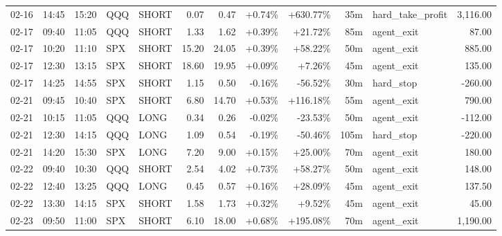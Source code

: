 \documentclass[11pt,a4paper,twoside]{article}
\begin{document}
\begin{center}
\begin{longtable}{>{\color{txtmain}}l l l l l r r r r r >{\color{txtmain}}l r}
02-16 & 14:45 & 15:20 & QQQ & SHORT & 0.07 & 0.47 & \textcolor{wingreen}{+0.74\%} & \textcolor{wingreen}{+630.77\%} & 35m & hard\_take\_profit & \textcolor{wingreen}{3,116.00} \\
02-17 & 09:40 & 11:05 & QQQ & SHORT & 1.33 & 1.62 & \textcolor{wingreen}{+0.39\%} & \textcolor{wingreen}{+21.72\%} & 85m & agent\_exit & \textcolor{wingreen}{87.00} \\
02-17 & 10:20 & 11:10 & SPX & SHORT & 15.20 & 24.05 & \textcolor{wingreen}{+0.39\%} & \textcolor{wingreen}{+58.22\%} & 50m & agent\_exit & \textcolor{wingreen}{885.00} \\
02-17 & 12:30 & 13:15 & SPX & SHORT & 18.60 & 19.95 & \textcolor{wingreen}{+0.09\%} & \textcolor{wingreen}{+7.26\%} & 45m & agent\_exit & \textcolor{wingreen}{135.00} \\
02-17 & 14:25 & 14:55 & SPX & SHORT & 1.15 & 0.50 & \textcolor{lossred}{-0.16\%} & \textcolor{lossred}{-56.52\%} & 30m & hard\_stop & \textcolor{lossred}{-260.00} \\
02-21 & 09:45 & 10:40 & SPX & SHORT & 6.80 & 14.70 & \textcolor{wingreen}{+0.53\%} & \textcolor{wingreen}{+116.18\%} & 55m & agent\_exit & \textcolor{wingreen}{790.00} \\
02-21 & 10:15 & 11:05 & QQQ & LONG & 0.34 & 0.26 & \textcolor{lossred}{-0.02\%} & \textcolor{lossred}{-23.53\%} & 50m & agent\_exit & \textcolor{lossred}{-112.00} \\
02-21 & 12:30 & 14:15 & QQQ & LONG & 1.09 & 0.54 & \textcolor{lossred}{-0.19\%} & \textcolor{lossred}{-50.46\%} & 105m & hard\_stop & \textcolor{lossred}{-220.00} \\
02-21 & 14:20 & 15:30 & SPX & LONG & 7.20 & 9.00 & \textcolor{wingreen}{+0.15\%} & \textcolor{wingreen}{+25.00\%} & 70m & agent\_exit & \textcolor{wingreen}{180.00} \\
02-22 & 09:40 & 10:30 & QQQ & SHORT & 2.54 & 4.02 & \textcolor{wingreen}{+0.73\%} & \textcolor{wingreen}{+58.27\%} & 50m & agent\_exit & \textcolor{wingreen}{148.00} \\
02-22 & 12:40 & 13:25 & QQQ & LONG & 0.45 & 0.57 & \textcolor{wingreen}{+0.16\%} & \textcolor{wingreen}{+28.09\%} & 45m & agent\_exit & \textcolor{wingreen}{137.50} \\
02-22 & 13:30 & 14:15 & SPX & SHORT & 1.58 & 1.73 & \textcolor{wingreen}{+0.32\%} & \textcolor{wingreen}{+9.52\%} & 45m & agent\_exit & \textcolor{wingreen}{45.00} \\
02-23 & 09:50 & 11:00 & SPX & SHORT & 6.10 & 18.00 & \textcolor{wingreen}{+0.68\%} & \textcolor{wingreen}{+195.08\%} & 70m & agent\_exit & \textcolor{wingreen}{1,190.00} \\

\end{longtable}
\end{center}
\end{document}
